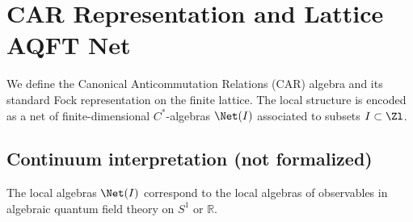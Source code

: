 \chapter{CAR Representation and Lattice AQFT Net}
We define the Canonical Anticommutation Relations (CAR) algebra and its standard Fock representation on the finite lattice. The local structure is encoded as a net of finite-dimensional $C^*$-algebras $\Net(I)$ associated to subsets $I \subset \Zl$.

\section{Continuum interpretation (not formalized)}
The local algebras $\Net(I)$ correspond to the local algebras of observables in algebraic quantum field theory on $S^1$ or $\mathbb{R}$.
